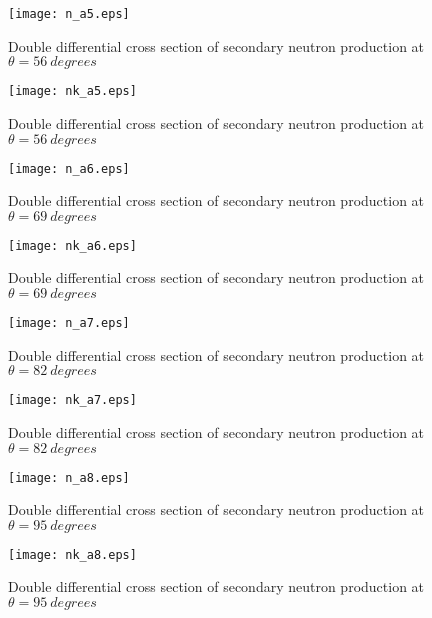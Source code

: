 \documentclass[12pt]{article}
\begin{document}
\begin{figure}[htbp]
\caption{Double differential cross section of secondary neutron production at $\theta = 56~degrees$}
\label{figa5} 
\centerline{\texttt{[image: n\_a5.eps]}}
\end{figure}

\begin{figure}[htbp]
\caption{Double differential cross section of secondary neutron production at $\theta = 56~degrees$}
\label{figa5a} 
\centerline{\texttt{[image: nk\_a5.eps]}}
\end{figure}

\begin{figure}[htbp]
\caption{Double differential cross section of secondary neutron production at $\theta = 69~degrees$}
\label{figa6} 
\centerline{\texttt{[image: n\_a6.eps]}}
\end{figure}

\begin{figure}[htbp]
\caption{Double differential cross section of secondary neutron production at $\theta = 69~degrees$}
\label{figa6a} 
\centerline{\texttt{[image: nk\_a6.eps]}}
\end{figure}

\begin{figure}[htbp]
\caption{Double differential cross section of secondary neutron production at $\theta = 82~degrees$}
\label{figa7} 
\centerline{\texttt{[image: n\_a7.eps]}}
\end{figure}

\begin{figure}[htbp]
\caption{Double differential cross section of secondary neutron production at $\theta = 82~degrees$}
\label{figa7a} 
\centerline{\texttt{[image: nk\_a7.eps]}}
\end{figure}

\begin{figure}[htbp]
\caption{Double differential cross section of secondary neutron production at $\theta = 95~degrees$}
\label{figa8} 
\centerline{\texttt{[image: n\_a8.eps]}}
\end{figure}

\begin{figure}[htbp]
\caption{Double differential cross section of secondary neutron production at $\theta = 95~degrees$}
\label{figa8a} 
\centerline{\texttt{[image: nk\_a8.eps]}}
\end{figure}
\end{document}
